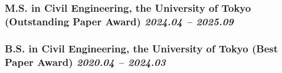 \documentclass[uplatex,a4paper,10pt,dvipdfmx]{jsarticle}
\begin{document}
\subsubsection*{M.S. in Civil Engineering, the University of Tokyo (Outstanding Paper Award) \hfill \textit{2024.04 -- 2025.09}}
\subsubsection*{B.S. in Civil Engineering, the University of Tokyo (Best Paper Award) \hfill \textit{2020.04 -- 2024.03}}

\nocite{*}

\printbibliography[filter=journal, title={Journal Articles}]

\printbibliography[filter=conf-intl, title={International Conferences}]

\printbibliography[filter=conf-dom, title={Domestic Conferences}]

\printbibliography[filter=grant, title={Grants}]

\printbibliography[filter=award, title={Awards}]
\end{document}
